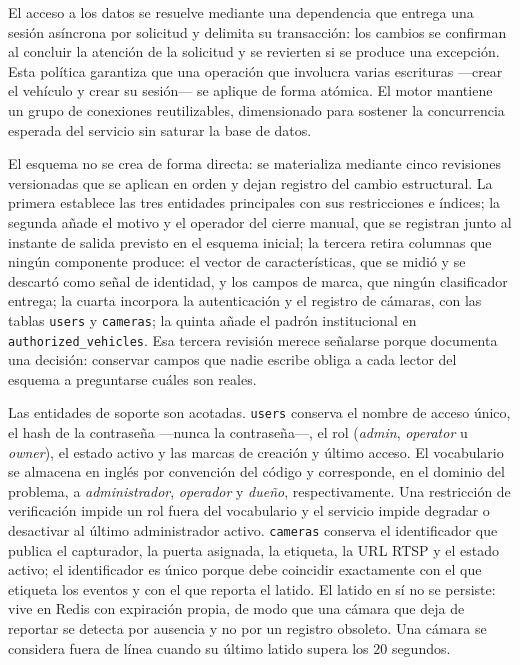 El acceso a los datos se resuelve mediante una dependencia que entrega una sesión
asíncrona por solicitud y delimita su transacción: los cambios se confirman al
concluir la atención de la solicitud y se revierten si se produce una excepción.
Esta política garantiza que una operación que involucra varias escrituras
---crear el vehículo y crear su sesión--- se aplique de forma atómica. El motor
mantiene un grupo de conexiones reutilizables, dimensionado para sostener la
concurrencia esperada del servicio sin saturar la base de datos.

El esquema no se crea de forma directa: se materializa mediante cinco revisiones
versionadas que se aplican en orden y dejan registro del cambio estructural. La
primera establece las tres entidades principales con sus restricciones e índices;
la segunda añade el motivo y el operador del cierre manual, que se registran junto
al instante de salida previsto en el esquema inicial; la tercera retira columnas
que ningún componente produce: el vector de características, que se midió y se
descartó como señal de identidad, y los campos de marca, que ningún clasificador
entrega; la cuarta incorpora la autenticación y el registro de cámaras, con las
tablas \texttt{users} y \texttt{cameras}; la quinta añade el padrón
institucional en \texttt{authorized\_vehicles}. Esa tercera revisión merece señalarse
porque documenta una decisión: conservar campos que nadie escribe obliga a cada
lector del esquema a preguntarse cuáles son reales.

Las entidades de soporte son acotadas. \texttt{users} conserva el nombre de
acceso único, el hash de la contraseña ---nunca la contraseña---, el rol
(\textit{admin}, \textit{operator} u \textit{owner}), el estado activo y las
marcas de creación y último acceso. El vocabulario se almacena en inglés por
convención del código y corresponde, en el dominio del problema, a
\emph{administrador}, \emph{operador} y \emph{dueño}, respectivamente. Una
restricción de verificación impide un rol
fuera del vocabulario y el servicio impide degradar o desactivar al último
administrador activo. \texttt{cameras} conserva el identificador que publica el
capturador, la puerta asignada, la etiqueta, la URL RTSP y el estado activo; el
identificador es único porque debe coincidir exactamente con el que etiqueta los
eventos y con el que reporta el latido. El latido en sí no se persiste: vive en
Redis con expiración propia, de modo que una cámara que deja de reportar se
detecta por ausencia y no por un registro obsoleto. Una cámara se considera fuera
de línea cuando su último latido supera los $20$ segundos.


